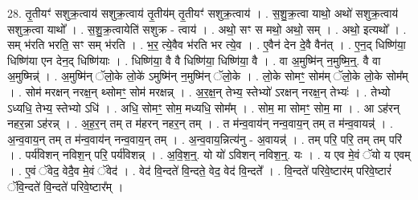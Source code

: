 \documentclass[17pt]{extarticle}
\begin{document}
28. तृ॒तीयꣳ॑ सशुक्र॒त्वाय॑ सशुक्र॒त्वाय॑ तृ॒तीय॑म् तृ॒तीयꣳ॑ सशुक्र॒त्वाय॑ । . स॒शु॒क्र॒त्वा याथो॒ अथो॑ सशुक्र॒त्वाय॑ सशुक्र॒त्वा याथो᳚ । . स॒शु॒क्र॒त्वायेति॑ सशुक्र - त्वाय॑ । . अथो॒ सꣳ स मथो॒ अथो॒ सम् । . अथो॒ इत्यथो᳚ । . सम् भ॑रति भरति॒ सꣳ सम् भ॑रति । . भ॒र॒ त्ये॒वैव भ॑रति भर त्ये॒व । . ए॒वैन॑ देन दे॒वै वैन॑त् । . ए॒न॒द् धिष्णि॑या॒ धिष्णि॑या एन देन॒द् धिष्णि॑याः । . धिष्णि॑या॒ वै वै धिष्णि॑या॒ धिष्णि॑या॒ वै । . वा अ॒मुष्मि॑न् न॒मुष्मि॒न्॒. वै वा अ॒मुष्मिन्न्॑ । . अ॒मुष्मि॑न् ॅलो॒के लो॒के॑ ऽमुष्मि॑न् न॒मुष्मि॑न् ॅलो॒के । . लो॒के सोमꣳ॒॒ सोम॑म् ॅलो॒के लो॒के सोम᳚म् । . सोम॑ मरक्षन् नरक्ष॒न् थ्सोमꣳ॒॒ सोम॑ मरक्षन्न् । . अ॒र॒क्ष॒न् तेभ्य॒ स्तेभ्यो॑ ऽरक्षन् नरक्ष॒न् तेभ्यः॑ । . तेभ्यो ऽध्यधि॒ तेभ्य॒ स्तेभ्यो ऽधि॑ । . अधि॒ सोमꣳ॒॒ सोम॒ मध्यधि॒ सोम᳚म् । . सोम॒ मा सोमꣳ॒॒ सोम॒ मा । . आ ऽह॑रन् नहर॒न्ना ऽह॑रन्न् । . अ॒ह॒र॒न् तम् त म॑हरन् नहर॒न् तम् । . त म॑न्व॒वाय॑न् नन्व॒वाय॒न् तम् त म॑न्व॒वायन्न्॑ । . अ॒न्व॒वाय॒न् तम् त म॑न्व॒वाय॑न् नन्व॒वाय॒न् तम् । . अ॒न्व॒वाय॒न्नित्य॑नु - अ॒वायन्न्॑ । . तम् परि॒ परि॒ तम् तम् परि॑ । . पर्य॑विशन् नविश॒न् परि॒ पर्य॑विशन्न् । . अ॒वि॒श॒न्॒. यो यो॑ ऽविशन् नविश॒न्॒. यः । . य एव मे॒वं ॅयो य एवम् । . ए॒वं ॅवेद॒ वेदै॒व मे॒वं ॅवेद॑ । . वेद॑ वि॒न्दते॑ वि॒न्दते॒ वेद॒ वेद॑ वि॒न्दते᳚ । . वि॒न्दते॑ परिवे॒ष्टार॑म् परिवे॒ष्टारं॑ ॅवि॒न्दते॑ वि॒न्दते॑ परिवे॒ष्टार᳚म् । \newline
\end{document}
